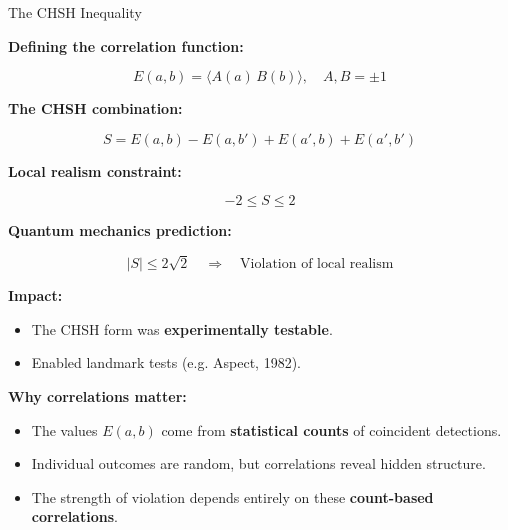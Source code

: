 \begin{frame}{The CHSH Inequality}

\begin{minipage}{0.58\textwidth}

\textbf{Defining the correlation function:}

\vspace{-0.5cm}

\[
E(a,b) = \langle A(a) \, B(b) \rangle, 
\quad A, B = \pm 1
\]

\pause

\vspace{-0.2cm}

\textbf{The CHSH combination:}

\vspace{-0.6cm}

\[
S = E(a, b) - E(a, b') + E(a', b) + E(a', b')
\]

\pause

\vspace{-0.3cm}

\textbf{Local realism constraint:}

\vspace{-0.5cm}

\[
-2 \leq S \leq 2
\]

\pause

\vspace{-0.3cm}

\textbf{Quantum mechanics prediction:}

\vspace{-0.6cm}

\[
|S| \leq 2\sqrt{2} \quad \Rightarrow \quad \text{Violation of local realism}
\]

\pause

\vspace{-0.3cm}


\textbf{Impact:}
\begin{itemize}
  \item The CHSH form was \textbf{experimentally testable}.  
  \item Enabled landmark tests (e.g. Aspect, 1982).  
\end{itemize}

\end{minipage}
\hfill
\begin{minipage}{0.36\textwidth}

\textbf{Why correlations matter:}

\begin{itemize}
  \item The values $E(a,b)$ come from \textbf{statistical counts} of coincident detections.  
  \item Individual outcomes are random, but correlations reveal hidden structure.  
  \item The strength of violation depends entirely on these \textbf{count-based correlations}.  
\end{itemize}

\end{minipage}

\end{frame}



